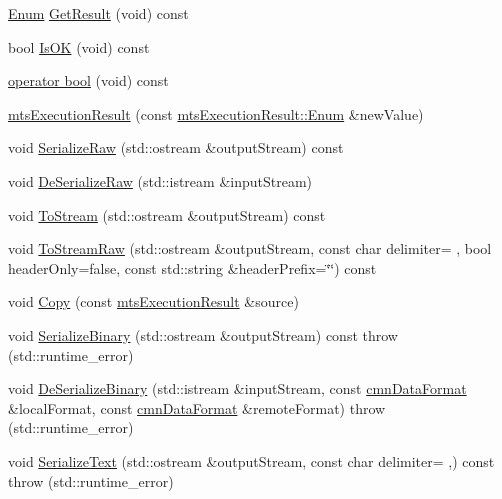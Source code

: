 \begin{DoxyCompactItemize}
\item 
\hyperlink{classmts_execution_result_a10c4246c82ac99d88e5f716f79407b77}{Enum} \hyperlink{classmts_execution_result_a97d469c280732963f2ff1bc1d3416bed}{Get\+Result} (void) const 
\item 
bool \hyperlink{classmts_execution_result_a0d14b7c78844af4128957e4e536fc7a7}{Is\+O\+K} (void) const 
\item 
\hyperlink{classmts_execution_result_a8ae076a61516dd11f7d704766347989f}{operator bool} (void) const 
\item 
\hyperlink{classmts_execution_result_a54ad2e98cdfc7ddbb888e38ca18f3596}{mts\+Execution\+Result} (const \hyperlink{classmts_execution_result_a10c4246c82ac99d88e5f716f79407b77}{mts\+Execution\+Result\+::\+Enum} \&new\+Value)
\item 
void \hyperlink{classmts_execution_result_af3a2cbc369a1e4df9314403dc29c8e54}{Serialize\+Raw} (std\+::ostream \&output\+Stream) const 
\item 
void \hyperlink{classmts_execution_result_adaf9847427fe146518ad51443df8954e}{De\+Serialize\+Raw} (std\+::istream \&input\+Stream)
\item 
void \hyperlink{classmts_execution_result_ab1f7204fb5b25846ec4475ffb2acde4e}{To\+Stream} (std\+::ostream \&output\+Stream) const 
\item 
void \hyperlink{classmts_execution_result_a9930412c7773e887c4abb1c4557de0d7}{To\+Stream\+Raw} (std\+::ostream \&output\+Stream, const char delimiter= \textquotesingle{} \textquotesingle{}, bool header\+Only=false, const std\+::string \&header\+Prefix=\char`\"{}\char`\"{}) const 
\item 
void \hyperlink{classmts_execution_result_a33cf4e23ab0f3921d3c784868ff05909}{Copy} (const \hyperlink{classmts_execution_result}{mts\+Execution\+Result} \&source)
\item 
void \hyperlink{classmts_execution_result_a772e723fada8477465de0fb91226cbb7}{Serialize\+Binary} (std\+::ostream \&output\+Stream) const   throw (std\+::runtime\+\_\+error)
\item 
void \hyperlink{classmts_execution_result_a7d30fa2a8b6b682cb45b214fc9e589c7}{De\+Serialize\+Binary} (std\+::istream \&input\+Stream, const \hyperlink{classcmn_data_format}{cmn\+Data\+Format} \&local\+Format, const \hyperlink{classcmn_data_format}{cmn\+Data\+Format} \&remote\+Format)  throw (std\+::runtime\+\_\+error)
\item 
void \hyperlink{classmts_execution_result_a606b1a632ed11580e22f8205d4e81c1b}{Serialize\+Text} (std\+::ostream \&output\+Stream, const char delimiter= \textquotesingle{},\textquotesingle{}) const   throw (std\+::runtime\+\_\+error)

\end{DoxyCompactItemize}
